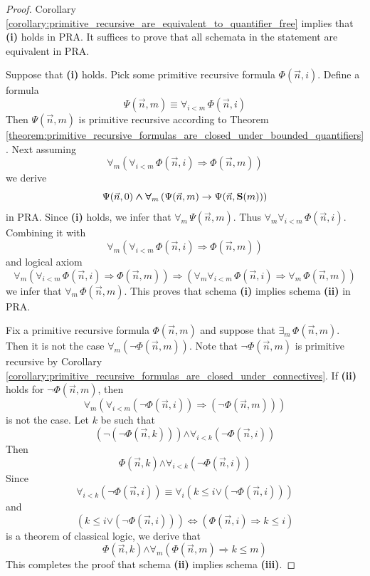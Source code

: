 \documentclass[10pt]{amsart}
\newcommand{\mforall}{\boldsymbol{\forall}}
\newcommand{\mexists}{\boldsymbol{\exists}}
\newcommand{\mra}{\boldsymbol{\Rightarrow}}
\newcommand{\mequiv}{\boldsymbol{\Leftrightarrow}}
\newcommand{\mand}{\boldsymbol{\wedge}}
\newcommand{\mor}{\boldsymbol{\vee}}
\newcommand{\mneg}{\boldsymbol{\neg}}
\newcommand{\mle}{\boldsymbol{<}}
\newcommand{\mleq}{\boldsymbol{\leq}}
\begin{document}
\begin{proof}
	Corollary \ref{corollary:primitive_recursive_are_equivalent_to_quantifier_free} implies that \textbf{(i)} holds in $\mathrm{PRA}$. It suffices to prove that all schemata in the statement are equivalent in $\mathrm{PRA}$.

	Suppose that \textbf{(i)} holds. Pick some primitive recursive formula $\Phi(\vec{n},i)$. Define a formula
	$$\Psi(\vec{n},m) \equiv \mforall_{i \mle m}\,\Phi(\vec{n},i)$$
	Then $\Psi(\vec{n},m)$ is primitive recursive according to Theorem \ref{theorem:primitive_recursive_formulas_are_closed_under_bounded_quantifiers}. Next assuming
	$$\mforall_m\left(\mforall_{i \mle m}\,\Phi(\vec{n},i) \mra \Phi(\vec{n},m)\right)$$
	we derive
	$$\Psi(\vec{n},0) \mand \mforall_m\left(\Psi(\vec{n},m)\ra \Psi(\vec{n},\bd{S}(m))\right)$$
	in $\mathrm{PRA}$. Since \textbf{(i)} holds, we infer that $\mforall_m\,\Psi(\vec{n},m)$. Thus $\mforall_m\mforall_{i \mle m}\,\Phi(\vec{n},i)$. Combining it with
	$$\mforall_m\left(\mforall_{i \mle m}\,\Phi(\vec{n},i) \mra \Phi(\vec{n},m)\right)$$
	and logical axiom
	$$\mforall_m\left(\mforall_{i \mle m}\,\Phi(\vec{n},i) \mra \Phi(\vec{n},m)\right) \mra \left(\mforall_m\mforall_{i \mle m}\,\Phi(\vec{n},i) \mra \mforall_m\,\Phi(\vec{n},m)\right)$$
	we infer that $\mforall_m\,\Phi(\vec{n},m)$. This proves that schema \textbf{(i)} implies schema \textbf{(ii)} in $\mathrm{PRA}$.

	Fix a primitive recursive formula $\Phi(\vec{n},m)$ and suppose that $\mexists_m\,\Phi(\vec{n},m)$. Then it is not the case $\mforall_m\left(\mneg \Phi(\vec{n},m)\right)$. Note that $\mneg \Phi(\vec{n},m)$ is primitive recursive by Corollary \ref{corollary:primitive_recursive_formulas_are_closed_under_connectives}. If \textbf{(ii)} holds for $\mneg \Phi(\vec{n},m)$, then
	$$\mforall_m\left(\mforall_{i \mle m}\left(\mneg \Phi(\vec{n},i)\right) \mra \left(\mneg \Phi(\vec{n},m)\right)\right)$$
	is not the case. Let $k$ be such that
	$$\left(\mneg \left(\mneg \Phi(\vec{n},k)\right)\right) \mand \mforall_{i \mle k}\left(\mneg \Phi(\vec{n},i)\right)$$
	Then
	$$\Phi(\vec{n},k) \mand \mforall_{i \mle k}\left(\mneg \Phi(\vec{n},i)\right)$$
	Since
	$$\mforall_{i \mle k}\left(\mneg \Phi(\vec{n},i)\right) \equiv \mforall_i\left(k \mleq i \mor \left(\mneg \Phi(\vec{n},i)\right)\right)$$
	and
	$$\left(k \mleq i \mor \left(\mneg \Phi(\vec{n},i)\right)\right) \mequiv \left(\Phi(\vec{n},i) \mra k \mleq i\right)$$
	is a theorem of classical logic, we derive that
	$$\Phi(\vec{n},k) \mand \mforall_m\left(\Phi(\vec{n},m) \mra k \mleq m\right)$$
	This completes the proof that schema \textbf{(ii)} implies schema \textbf{(iii)}.


\end{proof}
\end{document}
